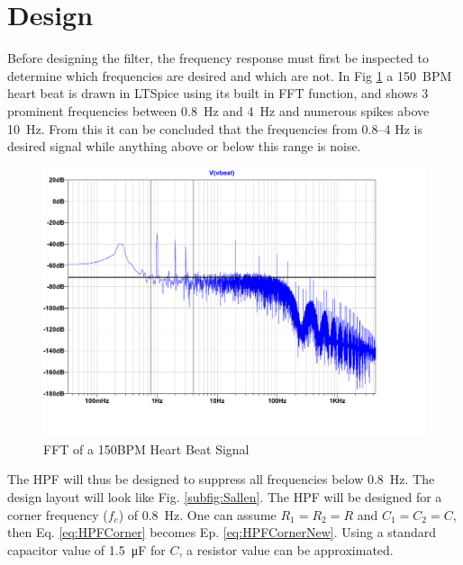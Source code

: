 

\section{Design} \label{sec:heartDesign}
Before designing the filter, the frequency response must first be inspected to determine which frequencies are desired and which are not. In Fig \ref{fig:FFT} a \SI{150}{BPM} heart beat is drawn in LTSpice using its built in FFT function, and shows 3 prominent frequencies between \SI{0.8}{\hertz} and \SI{4}{\hertz} and numerous spikes above \SI{10}{\hertz}. From this it can be concluded that the frequencies from \numrange{0.8}{4} \si{\hertz} is desired signal while anything above or below this range is noise.\par

\begin{figure}[H]
    \centering
    \includegraphics[width = 0.65\linewidth]{./Figures/FFT150BPM_cropped.pdf}
    \caption[Frequency response of Heartbeat]{FFT of a 150BPM Heart Beat Signal}
    \label{fig:FFT}
\end{figure}



 The HPF will thus be designed to suppress all frequencies below \SI{0.8}{\hertz}. The design layout will look like Fig. \ref{subfig:Sallen}. The HPF will be designed for a corner frequency ($f_{c}$) of \SI{0.8}{\hertz}. One can assume $R_{1} = R_{2} = R$ and $C_{1} = C_{2} = C$, then Eq. \ref{eq:HPFCorner} becomes Ep. \ref{eq:HPFCornerNew}. Using a standard capacitor value of \SI{1.5}{\micro\farad} for $C$, a resistor value can be approximated.
 
